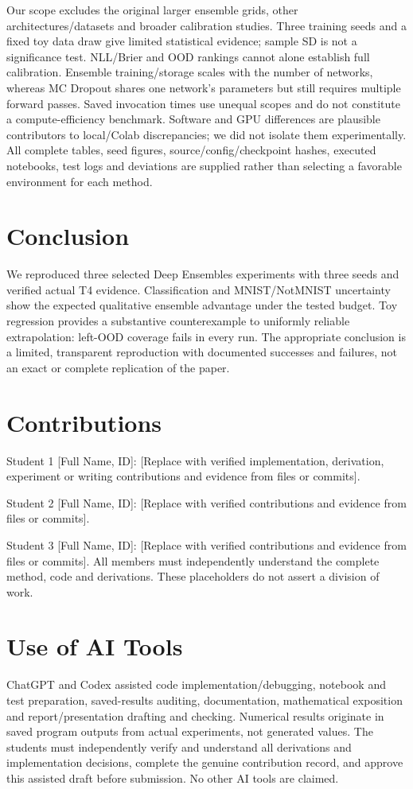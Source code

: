 \documentclass[11pt,a4paper]{article}
\begin{document}
Our scope excludes the original larger ensemble grids, other architectures/datasets and broader calibration studies. Three training seeds and a fixed toy data draw give limited statistical evidence; sample SD is not a significance test. NLL/Brier and OOD rankings cannot alone establish full calibration. Ensemble training/storage scales with the number of networks, whereas MC Dropout shares one network's parameters but still requires multiple forward passes. Saved invocation times use unequal scopes and do not constitute a compute-efficiency benchmark. Software and GPU differences are plausible contributors to local/Colab discrepancies; we did not isolate them experimentally. All complete tables, seed figures, source/config/checkpoint hashes, executed notebooks, test logs and deviations are supplied rather than selecting a favorable environment for each method.

\section{Conclusion}
\label{sec:conclusion}
We reproduced three selected Deep Ensembles experiments with three seeds and verified actual T4 evidence. Classification and MNIST/NotMNIST uncertainty show the expected qualitative ensemble advantage under the tested budget. Toy regression provides a substantive counterexample to uniformly reliable extrapolation: left-OOD coverage fails in every run. The appropriate conclusion is a limited, transparent reproduction with documented successes and failures, not an exact or complete replication of the paper.

\section*{Contributions}
Student 1 [Full Name, ID]: [Replace with verified implementation, derivation, experiment or writing contributions and evidence from files or commits].

Student 2 [Full Name, ID]: [Replace with verified contributions and evidence from files or commits].

Student 3 [Full Name, ID]: [Replace with verified contributions and evidence from files or commits]. All members must independently understand the complete method, code and derivations. These placeholders do not assert a division of work.

\section*{Use of AI Tools}
ChatGPT and Codex assisted code implementation/debugging, notebook and test preparation, saved-results auditing, documentation, mathematical exposition and report/presentation drafting and checking. Numerical results originate in saved program outputs from actual experiments, not generated values. The students must independently verify and understand all derivations and implementation decisions, complete the genuine contribution record, and approve this assisted draft before submission. No other AI tools are claimed.
\end{document}
